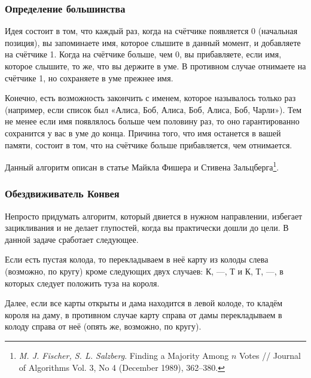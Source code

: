 \documentclass[twoside]{book}
\begin{document}
\subsubsection*{Определение большинства}%

Идея состоит в том, что каждый раз, когда на счётчике появляется 0 (начальная позиция), 
вы запоминаете имя, которое слышите в данный момент, и добавляете на счётчике 1.
Когда на счётчике больше, чем 0, вы прибавляете, если имя, которое  слышите, то же, что вы держите в уме.
В противном случае  отнимаете на счётчике 1, но сохраняете в уме прежнее имя.

Конечно, есть возможность закончить с именем, которое называлось только раз (например, если список был «Алиса, Боб, Алиса, Боб, Алиса, Боб, Чарли»).
Тем не менее если имя появлялось больше чем половину раз, то оно гарантированно сохранится у вас в уме до конца.
Причина того, что имя останется в вашей памяти, состоит в том, что на счётчике больше прибавляется, чем отнимается.

Данный алгоритм описан в статье Майкла Фишера и Стивена Зальцберга\footnote{\emph{M. J. Fischer, S. L. Salzberg}. Finding a Majority Among $n$ Votes /\!/ {Journal of Algorithms} Vol. 3, No 4 (December 1989),  362--380.}.

\subsubsection*{Обездвиживатель Конвея}%

Непросто придумать алгоритм, который двиется в нужном направлении, избегает зацикливания и не делает глупостей, когда вы практически дошли до цели.
В данной задаче сработает следующее.


Если есть пустая колода, то перекладываем в неё карту из колоды слева (возможно, по кругу) кроме следующих двух случаев: К, ---, Т и К, Т, ---, в которых следует положить туза на короля.

Далее, если все карты открыты и дама находится в левой колоде, то кладём короля на даму, в противном случае карту справа от дамы перекладываем в колоду справа от неё (опять же, возможно, по кругу).
\end{document}
